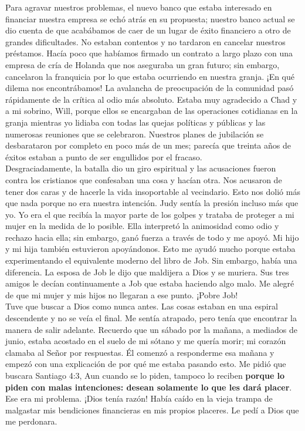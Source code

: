 \documentclass[twoside, 12pt]{book}
\begin{document}
Para agravar nuestros problemas, el nuevo banco que estaba interesado en financiar nuestra empresa se echó atrás en su propuesta; nuestro banco actual se dio cuenta de que acabábamos de caer de un lugar de éxito financiero a otro de grandes dificultades. No estaban contentos y no tardaron en cancelar nuestros préstamos. Hacía poco que habíamos firmado un contrato a largo plazo con una empresa de cría de Holanda que nos aseguraba un gran futuro; sin embargo, cancelaron la franquicia por lo que estaba ocurriendo en nuestra granja. ¡En qué dilema nos encontrábamos! La avalancha de preocupación de la comunidad pasó rápidamente de la crítica al odio más absoluto. Estaba muy agradecido a Chad y a mi sobrino, Will, porque ellos se encargaban de las operaciones cotidianas en la granja mientras yo lidiaba con todas las quejas políticas y públicas y las numerosas reuniones que se celebraron. Nuestros planes de jubilación se desbarataron por completo en poco más de un mes; parecía que treinta años de éxitos estaban a punto de ser engullidos por el fracaso.\\

Desgraciadamente, la batalla dio un giro espiritual y las acusaciones fueron contra los cristianos que confesaban una cosa y hacían otra. Nos acusaron de tener dos caras y de hacerle la vida insoportable al vecindario. Esto nos dolió más que nada porque no era nuestra intención. Judy sentía la presión incluso más que yo. Yo era el que recibía la mayor parte de los golpes y trataba de proteger a mi mujer en la medida de lo posible. Ella interpretó la animosidad como odio y rechazo hacia ella; sin embargo, ganó fuerza a través de todo y me apoyó. Mi hijo y mi hija también estuvieron apoyándonos. Esto me ayudó mucho porque estaba experimentando el equivalente moderno del libro de Job. Sin embargo, había una diferencia. La esposa de Job le dijo que maldijera a Dios y se muriera. Sus tres amigos le decían continuamente a Job que estaba haciendo algo malo. Me alegré de que mi mujer y mis hijos no llegaran a ese punto. ¡Pobre Job!\\

Tuve que buscar a Dios como nunca antes. Las cosas estaban en una espiral descendente y no se veía el final. Me sentía atrapado, pero tenía que encontrar la manera de salir adelante. Recuerdo que un sábado por la mañana, a mediados de junio, estaba acostado en el suelo de mi sótano y me quería morir; mi corazón clamaba al Señor por respuestas. Él comenzó a responderme esa mañana y empezó con una explicación de por qué me estaba pasando esto. Me pidió que buscara Santiago 4:3, Aun cuando se lo piden, tampoco lo reciben \textbf{porque lo piden con malas intenciones: desean solamente lo que les dará placer}. Ese era mi problema. ¡Dios tenía razón! Había caído en la vieja trampa de malgastar mis bendiciones financieras en mis propios placeres. Le pedí a Dios que me perdonara.\\
\end{document}
